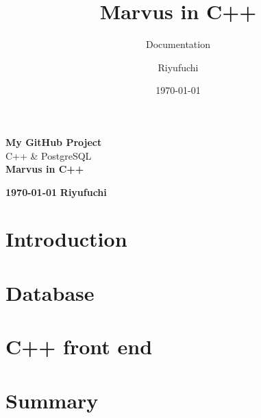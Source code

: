 \documentclass[12pt,a4paper,titlepage]{scrreprt}
\title{\vspace{6cm}Marvus in C++}
\subtitle{Documentation}
\author{Riyufuchi}
\date{\today}
\begin{document}
	
	
	\begin{titlepage}
		\begin{center}
			{\Large \textbf{My GitHub Project}} \\
			{\Large C++ \& PostgreSQL} \\
			\vfill
			{\Huge \textbf{Marvus in C++}}
			\vfill
		\end{center}
		{\large\textbf{ \today}} \hfill {\large \textbf{Riyufuchi}}
	\end{titlepage}
	
	\tableofcontents
	\newpage
	
	\clearpage
	\printglossary[type=main, title=Glossary]
	\printglossary[type=\acronymtype, style=mystyle]
	\clearpage
	\lstlistoflistings

	
	\chapter{Introduction}
	
	
	\chapter{Database}
	
	
	\chapter{C++ front end}
	
	\chapter*{Summary}
\end{document}
